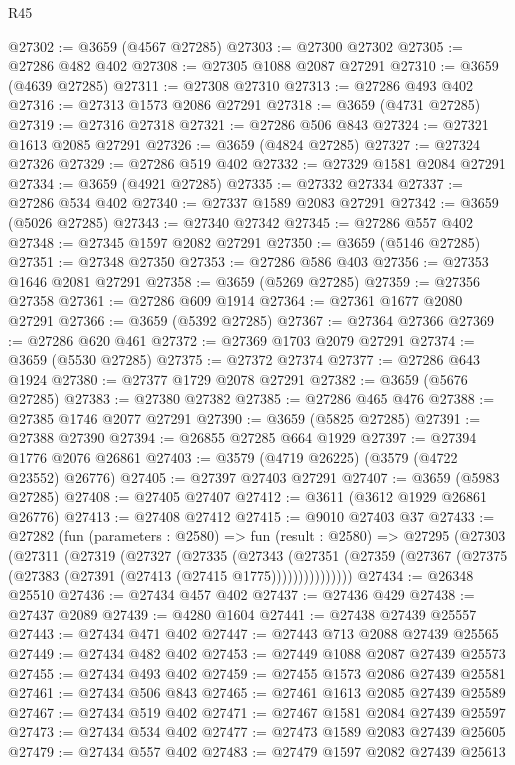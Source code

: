 \begin{lexlean}{R45}
\begin{coremodule}
@27302 := @3659 (@4567 @27285)
@27303 := @27300 @27302
@27305 := @27286 @482 @402
@27308 := @27305 @1088 @2087 @27291
@27310 := @3659 (@4639 @27285)
@27311 := @27308 @27310
@27313 := @27286 @493 @402
@27316 := @27313 @1573 @2086 @27291
@27318 := @3659 (@4731 @27285)
@27319 := @27316 @27318
@27321 := @27286 @506 @843
@27324 := @27321 @1613 @2085 @27291
@27326 := @3659 (@4824 @27285)
@27327 := @27324 @27326
@27329 := @27286 @519 @402
@27332 := @27329 @1581 @2084 @27291
@27334 := @3659 (@4921 @27285)
@27335 := @27332 @27334
@27337 := @27286 @534 @402
@27340 := @27337 @1589 @2083 @27291
@27342 := @3659 (@5026 @27285)
@27343 := @27340 @27342
@27345 := @27286 @557 @402
@27348 := @27345 @1597 @2082 @27291
@27350 := @3659 (@5146 @27285)
@27351 := @27348 @27350
@27353 := @27286 @586 @403
@27356 := @27353 @1646 @2081 @27291
@27358 := @3659 (@5269 @27285)
@27359 := @27356 @27358
@27361 := @27286 @609 @1914
@27364 := @27361 @1677 @2080 @27291
@27366 := @3659 (@5392 @27285)
@27367 := @27364 @27366
@27369 := @27286 @620 @461
@27372 := @27369 @1703 @2079 @27291
@27374 := @3659 (@5530 @27285)
@27375 := @27372 @27374
@27377 := @27286 @643 @1924
@27380 := @27377 @1729 @2078 @27291
@27382 := @3659 (@5676 @27285)
@27383 := @27380 @27382
@27385 := @27286 @465 @476
@27388 := @27385 @1746 @2077 @27291
@27390 := @3659 (@5825 @27285)
@27391 := @27388 @27390
@27394 := @26855 @27285 @664 @1929
@27397 := @27394 @1776 @2076 @26861
@27403 := @3579 (@4719 @26225) (@3579 (@4722 @23552) @26776)
@27405 := @27397 @27403 @27291
@27407 := @3659 (@5983 @27285)
@27408 := @27405 @27407
@27412 := @3611 (@3612 @1929 @26861 @26776)
@27413 := @27408 @27412
@27415 := @9010 @27403 @37
@27433 := @27282
    (fun (parameters : @2580) =>
    fun (result : @2580) =>
    @27295
      (@27303
        (@27311
          (@27319
            (@27327
              (@27335
                (@27343
                  (@27351
                    (@27359 (@27367 (@27375 (@27383 (@27391 (@27413 (@27415 @1775)))))))))))))))
@27434 := @26348 @25510
@27436 := @27434 @457 @402
@27437 := @27436 @429
@27438 := @27437 @2089
@27439 := @4280 @1604
@27441 := @27438 @27439 @25557
@27443 := @27434 @471 @402
@27447 := @27443 @713 @2088 @27439 @25565
@27449 := @27434 @482 @402
@27453 := @27449 @1088 @2087 @27439 @25573
@27455 := @27434 @493 @402
@27459 := @27455 @1573 @2086 @27439 @25581
@27461 := @27434 @506 @843
@27465 := @27461 @1613 @2085 @27439 @25589
@27467 := @27434 @519 @402
@27471 := @27467 @1581 @2084 @27439 @25597
@27473 := @27434 @534 @402
@27477 := @27473 @1589 @2083 @27439 @25605
@27479 := @27434 @557 @402
@27483 := @27479 @1597 @2082 @27439 @25613

\end{coremodule}
\end{lexlean}

